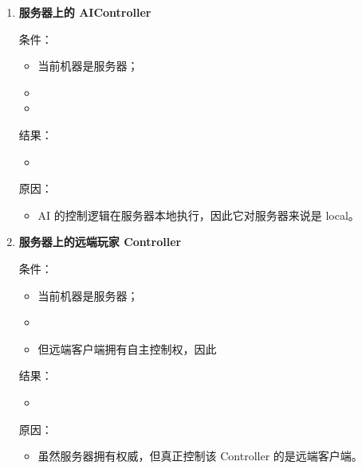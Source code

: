\begin{enumerate}
	原因：
	
	\begin{itemize}
		\item 这些对象只是远端同步到本机的表现，并不由当前客户端控制。
	\end{itemize}
	
	\item \textbf{服务器上的 AIController}
	
	条件：
	
	\begin{itemize}
		\item 当前机器是服务器；
		\item {}
		\item {}
	\end{itemize}
	
	结果：
	
	\begin{itemize}
		\item {}
	\end{itemize}
	
	原因：
	
	\begin{itemize}
		\item AI 的控制逻辑在服务器本地执行，因此它对服务器来说是 local。
	\end{itemize}
	
	\item \textbf{服务器上的远端玩家 Controller}
	
	条件：
	
	\begin{itemize}
		\item 当前机器是服务器；
		\item {}
		\item 但远端客户端拥有自主控制权，因此 
	\end{itemize}
	
	结果：
	
	\begin{itemize}
		\item {}
	\end{itemize}
	
	原因：
	
	\begin{itemize}
		\item 虽然服务器拥有权威，但真正控制该 Controller 的是远端客户端。
	\end{itemize}
	

\end{enumerate}
